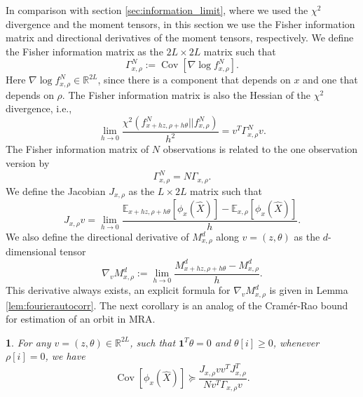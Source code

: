 \documentclass{IEEEtran}
\numberwithin{equation}{section}
\numberwithin{figure}{section}
\theoremstyle{plain}
\theoremstyle{definition}
\theoremstyle{remark}
\theoremstyle{plain}
\theoremstyle{remark}
\theoremstyle{plain}
\newtheorem{corollary}[thm]{\protect\corollaryname}
\theoremstyle{plain}
\theoremstyle{remark}
\providecommand{\corollaryname}{Corollary}
\newcommand{\reals}{\mathbb{R}}
\newcommand{\E}{\mathbb{E}}
\DeclareMathOperator*{\Cov}{Cov}
\newcommand{\ones}{{\mathbf{1}}}
\begin{document}
In comparison with section \ref{sec:information_limit}, where we used the $\chi^2$ divergence and the moment tensors, in this section we use the Fisher information matrix and directional derivatives of the moment tensors, respectively. We define the Fisher information matrix as the $2L\times 2L$ matrix such that
\begin{equation*}
\Gamma^N_{x,\rho}:=\Cov[\nabla \log f^N_{x,\rho}].
\end{equation*}
Here $\nabla \log f^N_{x,\rho}\in \reals^{2L}$, since there is a component that depends on $x$ and one that depends on $\rho$.
The Fisher information matrix is also the Hessian of the $\chi^2$ divergence, i.e.,
\begin{equation}\label{eq:chifisherhessian}
\lim_{h\rightarrow 0}\frac{\chi^2(f^N_{x+hz,\rho+h\theta}||f^N_{x,\rho})}{h^2}= v^T \Gamma^N_{x,\rho} v.
\end{equation}
The Fisher information matrix of $N$ observations is related to the one observation version by
\begin{equation}\label{eq:NFisher}
\Gamma^N_{x,\rho}= N \Gamma_{x,\rho}.
\end{equation}
We define the Jacobian $J_{x,\rho}$ as the $L\times 2L$ matrix such that
\begin{equation}\label{eq:jacobiandef}
J_{x,\rho}v=\lim_{h\rightarrow 0}\frac{\E_{x+hz,\rho+h\theta}[\phi_{x}(\widehat X)]-\E_{x,\rho}[\phi_{x}(\widehat X)]}{h}.
\end{equation}
We also define the directional derivative of $M^d_{x,\rho}$ along $v=(z,\theta)$ as the $d$-dimensional tensor
\begin{equation*}\label{eq:dirautocorr}
\nabla_v M^d_{x,\rho}:=\lim_{h\rightarrow 0}\frac{M^d_{x+hz,\rho+h\theta}-M^d_{x,\rho}}{h}.
\end{equation*}
This derivative always exists, an explicit formula for $\nabla_v M^d_{x,\rho}$ is given in Lemma \ref{lem:fourierautocorr}. The next corollary is an analog of the Cram\'er-Rao bound for estimation of an orbit in MRA.
\begin{corollary}\label{cor:CramerRao} 
	For any $v=(z,\theta)\in \reals^{2L}$, such that $\ones^T \theta=0$ and $\theta[i]\ge 0$, whenever $\rho[i]= 0$, we have
	\begin{equation*}
	\Cov[\phi_x(\widehat X)] \succeq \frac{J_{x,\rho}vv^TJ_{x,\rho}^T}{N v^T\Gamma_{x,\rho}v}.
	\end{equation*}
\end{corollary}
\end{document}
